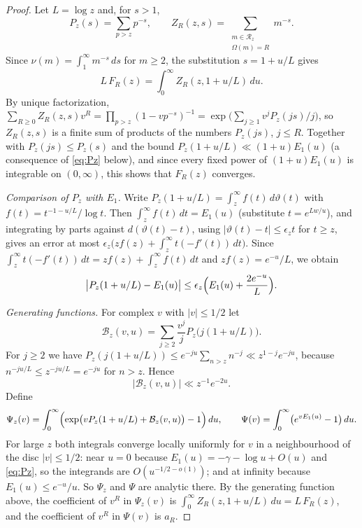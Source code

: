 \documentclass[11pt,a4paper]{article}
\numberwithin{equation}{section}
\theoremstyle{plain}
\theoremstyle{definition}
\theoremstyle{remark}
\newcommand{\cR}{\mathcal{R}}
\newcommand{\cB}{\mathcal{B}}
\begin{document}
\begin{proof}
Let $L=\log z$ and, for $s>1$,
\[
P_z(s)=\sum_{p>z}p^{-s},\qquad Z_R(z,s)=\sum_{\substack{m\in\cR_z\\ \Omega(m)=R}}m^{-s}.
\]
Since $\nu(m)=\int_1^\infty m^{-s}\,ds$ for $m\ge2$, the substitution $s=1+u/L$ gives
\[
L\,F_R(z)=\int_0^\infty Z_R(z,1+u/L)\,du .
\]
By unique factorization, $\sum_{R\ge0}Z_R(z,s)v^R=\prod_{p>z}(1-vp^{-s})^{-1}=\exp\bigl(\sum_{j\ge1}v^jP_z(js)/j\bigr)$, so $Z_R(z,s)$ is a finite sum of products of the numbers $P_z(js)$, $j\le R$. Together with $P_z(js)\le P_z(s)$ and the bound $P_z(1+u/L)\ll(1+u)E_1(u)$ (a consequence of \eqref{eq:Pz} below), and since every fixed power of $(1+u)E_1(u)$ is integrable on $(0,\infty)$, this shows that $F_R(z)$ converges.

\emph{Comparison of $P_z$ with $E_1$.} Write $P_z(1+u/L)=\int_z^\infty f(t)\,d\vartheta(t)$ with $f(t)=t^{-1-u/L}/\log t$. Then $\int_z^\infty f(t)\,dt=E_1(u)$ (substitute $t=e^{Lw/u}$), and integrating by parts against $d(\vartheta(t)-t)$, using $|\vartheta(t)-t|\le\epsilon_zt$ for $t\ge z$, gives an error at most $\epsilon_z\bigl(zf(z)+\int_z^\infty t(-f'(t))\,dt\bigr)$. Since $\int_z^\infty t(-f'(t))\,dt=zf(z)+\int_z^\infty f(t)\,dt$ and $zf(z)=e^{-u}/L$, we obtain
\begin{equation}\label{eq:Pz}
\bigl|P_z(1+u/L)-E_1(u)\bigr|\le\epsilon_z\Bigl(E_1(u)+\frac{2e^{-u}}{L}\Bigr).
\end{equation}

\emph{Generating functions.} For complex $v$ with $|v|\le1/2$ let
\[
\cB_z(v,u)=\sum_{j\ge2}\frac{v^j}{j}P_z\bigl(j(1+u/L)\bigr).
\]
For $j\ge2$ we have $P_z(j(1+u/L))\le e^{-ju}\sum_{n>z}n^{-j}\ll z^{1-j}e^{-ju}$, because $n^{-ju/L}\le z^{-ju/L}=e^{-ju}$ for $n>z$. Hence
\begin{equation}\label{eq:Bz}
|\cB_z(v,u)|\ll z^{-1}e^{-2u}.
\end{equation}
Define
\[
\Psi_z(v)=\int_0^\infty\Bigl(\exp\bigl(vP_z(1+u/L)+\cB_z(v,u)\bigr)-1\Bigr)\,du,\qquad
\Psi(v)=\int_0^\infty\bigl(e^{vE_1(u)}-1\bigr)\,du.
\]
For large $z$ both integrals converge locally uniformly for $v$ in a neighbourhood of the disc $|v|\le1/2$: near $u=0$ because $E_1(u)=-\gamma-\log u+O(u)$ and \eqref{eq:Pz}, so the integrands are $O(u^{-1/2-o(1)})$; and at infinity because $E_1(u)\le e^{-u}/u$. So $\Psi_z$ and $\Psi$ are analytic there. By the generating function above, the coefficient of $v^R$ in $\Psi_z(v)$ is $\int_0^\infty Z_R(z,1+u/L)\,du=L\,F_R(z)$, and the coefficient of $v^R$ in $\Psi(v)$ is $a_R$.


\end{proof}
\end{document}
